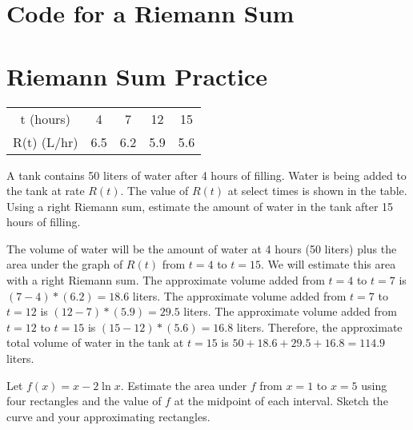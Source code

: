 \section{Code for a Riemann Sum}

\section{Riemann Sum Practice}

\begin{Exercise}[label=rsum2]
	\begin{center}
		\begin{tabular}{c|c|c|c|c}
			t (hours) & 4 & 7 & 12 & 15\\
			R(t) (L/hr) & 6.5 & 6.2 & 5.9 & 5.6\\
		\end{tabular}
	\end{center}
	A tank contains 50 liters of water after 4 hours of filling. Water is being added to the tank at rate $R(t)$. The value of $R(t)$ at select times is shown in the table. Using a right Riemann sum, estimate the amount of water in the tank after 15 hours of filling. 
\end{Exercise}

\begin{Answer}[ref=rsum2]
	The volume of water will be the amount of water at 4 hours (50 liters) plus the area under the graph of $R(t)$ from $t=4$ to $t=15$. We will estimate this area with a right Riemann sum. The approximate volume added from $t=4$ to $t=7$ is $(7-4)*(6.2) = 18.6$ liters. The approximate volume added from $t=7$ to $t=12$ is $(12-7)*(5.9)=29.5$ liters. The approximate volume added from $t=12$ to $t=15$ is $(15-12)*(5.6) = 16.8$ liters. Therefore, the approximate total volume of water in the tank at $t=15$ is $50 + 18.6 + 29.5 + 16.8 = 114.9$ liters. 
\end{Answer}

\begin{Exercise}[label=rsum3]
	Let $f(x) = x-2\ln{x}$. Estimate the area under $f$ from $x=1$ to $x=5$ using four rectangles and the value of $f$ at the midpoint of each interval. Sketch the curve and your approximating rectangles.
\end{Exercise}

